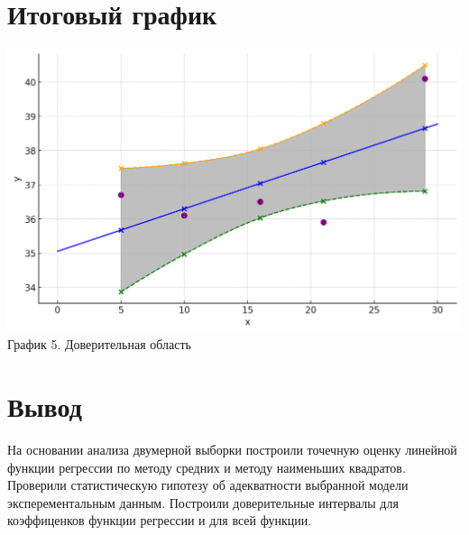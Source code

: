 \documentclass{article}
\begin{document}
\section*{Итоговый график}

\begin{center}
    \includegraphics[width=.9\textwidth]{res.png}\\
    График 5. Доверительная область
\end{center}

\section*{Вывод}

На основании анализа двумерной выборки построили точечную оценку линейной функции регрессии по методу средних и методу наименьших квадратов.
Проверили статистическую гипотезу об адекватности выбранной модели эксперементальным данным.
Построили доверительные интервалы для коэффиценков функции регрессии и для всей функции.
\end{document}
